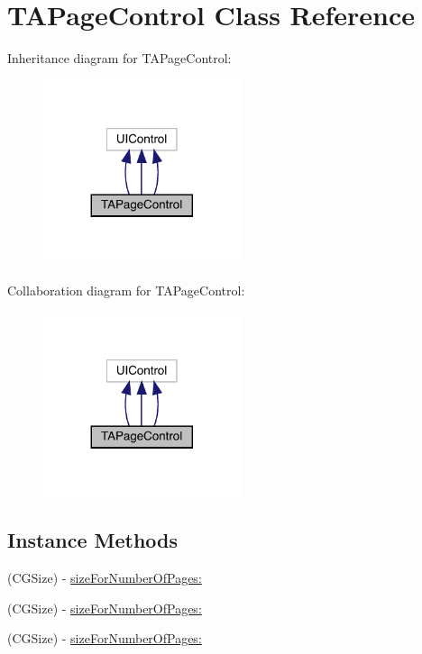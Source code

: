 \hypertarget{interface_t_a_page_control}{}\section{T\+A\+Page\+Control Class Reference}
\label{interface_t_a_page_control}


Inheritance diagram for T\+A\+Page\+Control\+:\nopagebreak
\begin{figure}[H]
\begin{center}
\leavevmode
\includegraphics[width=164pt]{interface_t_a_page_control__inherit__graph}
\end{center}
\end{figure}


Collaboration diagram for T\+A\+Page\+Control\+:\nopagebreak
\begin{figure}[H]
\begin{center}
\leavevmode
\includegraphics[width=164pt]{interface_t_a_page_control__coll__graph}
\end{center}
\end{figure}
\subsection*{Instance Methods}
\begin{DoxyCompactItemize}
\item 
(C\+G\+Size) -\/ \mbox{\hyperlink{interface_t_a_page_control_a215bb7b5e6e6db8e5146d751e6fe7719}{size\+For\+Number\+Of\+Pages\+:}}
\item 
(C\+G\+Size) -\/ \mbox{\hyperlink{interface_t_a_page_control_a215bb7b5e6e6db8e5146d751e6fe7719}{size\+For\+Number\+Of\+Pages\+:}}
\item 
(C\+G\+Size) -\/ \mbox{\hyperlink{interface_t_a_page_control_a215bb7b5e6e6db8e5146d751e6fe7719}{size\+For\+Number\+Of\+Pages\+:}}
\end{DoxyCompactItemize}
